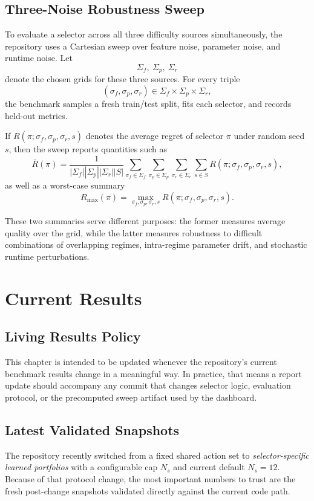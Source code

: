 \documentclass[11pt]{report}
\begin{document}
\section{Three-Noise Robustness Sweep}

To evaluate a selector across all three difficulty sources simultaneously, the repository uses a Cartesian sweep over feature noise, parameter noise, and runtime noise. Let
\[
\Sigma_f,\ \Sigma_p,\ \Sigma_r
\]
denote the chosen grids for these three sources. For every triple
\[
(\sigma_f, \sigma_p, \sigma_r) \in \Sigma_f \times \Sigma_p \times \Sigma_r,
\]
the benchmark samples a fresh train/test split, fits each selector, and records held-out metrics.

If $R(\pi; \sigma_f, \sigma_p, \sigma_r, s)$ denotes the average regret of selector $\pi$ under random seed $s$, then the sweep reports quantities such as
\[
\bar{R}(\pi) =
\frac{1}{|\Sigma_f||\Sigma_p||\Sigma_r||S|}
\sum_{\sigma_f \in \Sigma_f}
\sum_{\sigma_p \in \Sigma_p}
\sum_{\sigma_r \in \Sigma_r}
\sum_{s \in S}
R(\pi; \sigma_f, \sigma_p, \sigma_r, s),
\]
as well as a worst-case summary
\[
R_{\max}(\pi) =
\max_{\sigma_f,\sigma_p,\sigma_r,s}
R(\pi; \sigma_f, \sigma_p, \sigma_r, s).
\]

These two summaries serve different purposes: the former measures average quality over the grid, while the latter measures robustness to difficult combinations of overlapping regimes, intra-regime parameter drift, and stochastic runtime perturbations.

\chapter{Current Results}

\section{Living Results Policy}

This chapter is intended to be updated whenever the repository's current benchmark results change in a meaningful way. In practice, that means a report update should accompany any commit that changes selector logic, evaluation protocol, or the precomputed sweep artifact used by the dashboard.

\section{Latest Validated Snapshots}

The repository recently switched from a fixed shared action set to \emph{selector-specific learned portfolios} with a configurable cap $N_s$ and current default $N_s = 12$. Because of that protocol change, the most important numbers to trust are the fresh post-change snapshots validated directly against the current code path.
\end{document}

